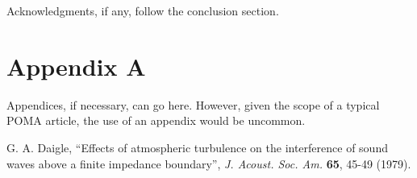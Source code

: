 \documentclass[12pt,letter]{article}
\begin{document}
Acknowledgments, if any, follow the conclusion section.

\appendix

\section*{Appendix A}

Appendices, if necessary, can go here. However, given the scope of a typical POMA article, the use of an appendix would be uncommon.


\begin{thebibliography}{9}

	G. A. Daigle, ``Effects of atmospheric turbulence on the interference of sound waves above a finite impedance boundary'', \textsl{J. Acoust. Soc. Am.} \textbf{65}, 45-49 (1979).

\end{thebibliography}
\end{document}
